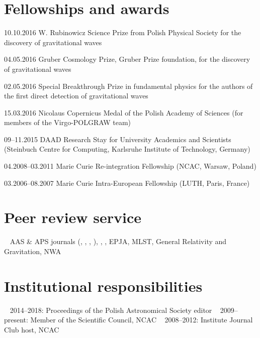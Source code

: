 \documentclass[]{friggeri-cv} %
\begin{document}

\section{Fellowships and awards}

\begin{entrylistshort}

\entrys 
{10.10.2016}
{W. Rubinowicz Science Prize from Polish Physical Society for the discovery of gravitational waves}  

\entrys 
{04.05.2016}
{Gruber Cosmology Prize, Gruber Prize foundation, for the discovery of gravitational waves}  

\entrys 
{02.05.2016}
{Special Breakthrough Prize in fundamental physics for the authors of the first direct detection of gravitational waves}  

\entrys
{15.03.2016} 
{Nicolaus Copernicus Medal of the Polish Academy of Sciences (for members of the Virgo-POLGRAW team)}   

\entrys
{09--11.2015} 
{DAAD Research Stay for University Academics and Scientists (Steinbuch Centre for Computing, Karlsruhe Institute of Technology, Germany)}  

\entrys 
{04.2008--03.2011} 
{Marie Curie Re-integration Fellowship (NCAC, Warsaw, Poland)}   

\entrys 
{03.2006--08.2007} 
{Marie Curie Intra-European Fellowship (LUTH, Paris, France)} 

\end{entrylistshort}





\pagebreak

\setlength{\voffset}{0pt}
\begin{aside} 
\section{Peer review service}
~ 
AAS \& APS journals ({\apj}, {\apjl}, {\prd}, {\prl}), 
{\mnras}, {\aap}, EPJA, MLST, General Relativity and Gravitation, NWA 
~
~ 
\section{Institutional responsibilities}
~
2014--2018: Proceedings of the Polish Astronomical Society editor
~
2009--present: Member of the Scientific Council, NCAC 
~
2008--2012: Institute Journal Club host, NCAC
\end{aside} 
\end{document}
